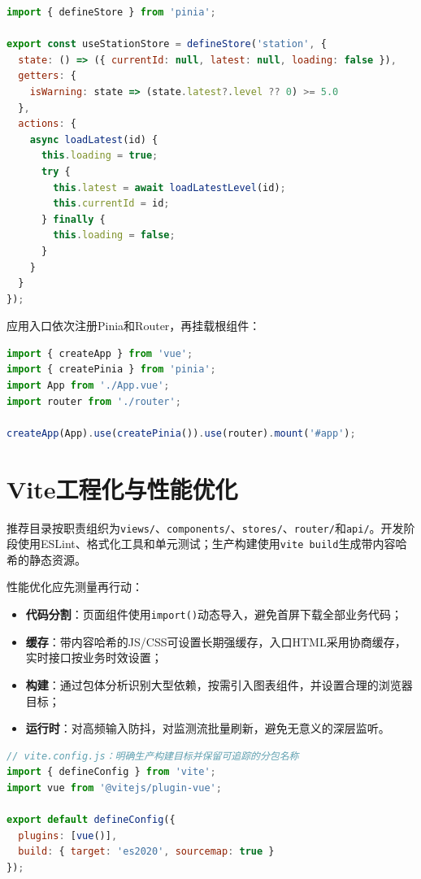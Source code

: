 \begin{lstlisting}[language=JavaScript]
import { defineStore } from 'pinia';

export const useStationStore = defineStore('station', {
  state: () => ({ currentId: null, latest: null, loading: false }),
  getters: {
    isWarning: state => (state.latest?.level ?? 0) >= 5.0
  },
  actions: {
    async loadLatest(id) {
      this.loading = true;
      try {
        this.latest = await loadLatestLevel(id);
        this.currentId = id;
      } finally {
        this.loading = false;
      }
    }
  }
});
\end{lstlisting}

应用入口依次注册Pinia和Router，再挂载根组件：

\begin{lstlisting}[language=JavaScript]
import { createApp } from 'vue';
import { createPinia } from 'pinia';
import App from './App.vue';
import router from './router';

createApp(App).use(createPinia()).use(router).mount('#app');
\end{lstlisting}

\section{Vite工程化与性能优化}

推荐目录按职责组织为\texttt{views/}、\texttt{components/}、\texttt{stores/}、\texttt{router/}和\texttt{api/}。开发阶段使用ESLint、格式化工具和单元测试；生产构建使用\texttt{vite build}生成带内容哈希的静态资源。

性能优化应先测量再行动：
\begin{itemize}
\item \textbf{代码分割}：页面组件使用\texttt{import()}动态导入，避免首屏下载全部业务代码；
\item \textbf{缓存}：带内容哈希的JS/CSS可设置长期强缓存，入口HTML采用协商缓存，实时接口按业务时效设置；
\item \textbf{构建}：通过包体分析识别大型依赖，按需引入图表组件，并设置合理的浏览器目标；
\item \textbf{运行时}：对高频输入防抖，对监测流批量刷新，避免无意义的深层监听。
\end{itemize}

\begin{lstlisting}[language=JavaScript]
// vite.config.js：明确生产构建目标并保留可追踪的分包名称
import { defineConfig } from 'vite';
import vue from '@vitejs/plugin-vue';

export default defineConfig({
  plugins: [vue()],
  build: { target: 'es2020', sourcemap: true }
});
\end{lstlisting}

